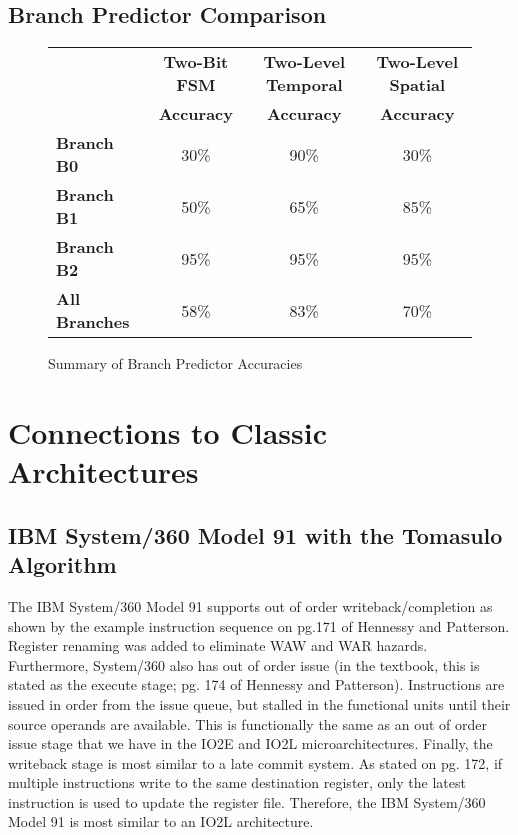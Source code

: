\documentclass[10pt]{article}
\begin{document}
\subsection{Branch Predictor Comparison}

\begin{figure}[H]
\centering
{\setlength{\tabcolsep}{3pt}
\begin{tabular}{lccc}
\hline
& \textbf{Two-Bit FSM} & \textbf{Two-Level Temporal} & \textbf{Two-Level Spatial} \\
& \textbf{Accuracy} & \textbf{Accuracy} & \textbf{Accuracy} \\ \hline
\textbf{Branch B0}    & 30\%& 90\%& 30\%\\ \hline
\textbf{Branch B1}    & 50\%& 65\%& 85\%\\ \hline
\textbf{Branch B2}    & 95\%& 95\%& 95\%\\ \hline
\textbf{All Branches} & 58\%& 83\%& 70\%\\ \hline
\end{tabular}
}
\caption{Summary of Branch Predictor Accuracies}
\end{figure}

\cleardoublepage
\section{Connections to Classic Architectures}

\subsection{IBM System/360 Model 91 with the Tomasulo Algorithm}
The IBM System/360 Model 91 supports out of order writeback/completion as shown by the example instruction sequence on pg.171 of Hennessy and Patterson. Register renaming was added to eliminate WAW and WAR hazards. Furthermore, System/360 also has out of order issue (in the textbook, this is stated as the execute stage; pg. 174 of Hennessy and Patterson). Instructions are issued in order from the issue queue, but stalled in the functional units until their source operands are available. This is functionally the same as an out of order issue stage that we have in the IO2E and IO2L microarchitectures. Finally, the writeback stage is most similar to a late commit system. As stated on pg. 172, if multiple instructions write to the same destination register, only the latest instruction is used to update the register file. Therefore, the IBM System/360 Model 91 is most similar to an IO2L architecture. 
\end{document}
